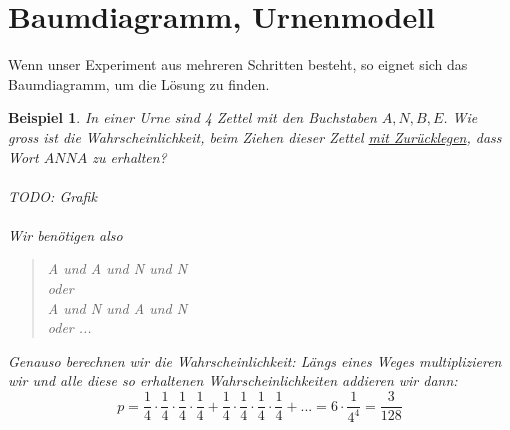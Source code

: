 \documentclass{report}
\newtheorem{myexample}{Beispiel}
\begin{document}
\section{Baumdiagramm, Urnenmodell}
Wenn unser Experiment aus mehreren Schritten besteht, so eignet sich das Baumdiagramm, um die Lösung zu finden.
\begin{myexample}
In einer Urne sind 4 Zettel mit den Buchstaben $A, N, B, E$. Wie gross ist die Wahrscheinlichkeit, beim Ziehen dieser Zettel \underline{mit Zurücklegen}, dass Wort $ANNA$ zu erhalten?
\\\\TODO: Grafik\\\\
Wir benötigen also
\begin{quote}
A und A und N und N\\
oder\\
A und N und A und N\\
oder ...
\end{quote}
Genauso berechnen wir die Wahrscheinlichkeit: Längs eines Weges multiplizieren wir und alle diese so erhaltenen Wahrscheinlichkeiten addieren wir dann:
\begin{equation}
p = \frac{1}{4} \cdot \frac{1}{4} \cdot \frac{1}{4} \cdot \frac{1}{4} + \frac{1}{4} \cdot \frac{1}{4} \cdot \frac{1}{4} \cdot \frac{1}{4} + ... = 6 \cdot \frac{1}{4^4} = \frac{3}{128}
\end{equation}
\end{myexample}
\end{document}
